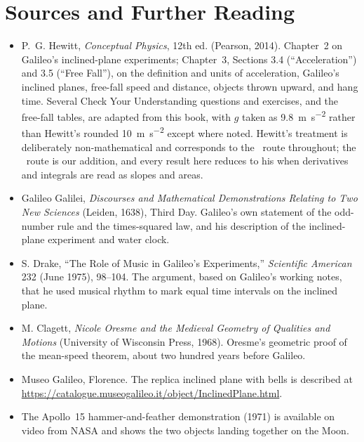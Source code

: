 \documentclass[11pt,twoside,openany]{book}
\newcommand{\viewtag}[3]{\fcolorbox{#2}{#3}{\footnotesize\textbf{\textcolor{#2}{#1}}}}
\newcommand{\elemtag}{\viewtag{Elementary}{elemcol}{elempale}}
\newcommand{\calctag}{\viewtag{Calculus}{calccol}{calcpale}}
\begin{document}
\section*{Sources and Further Reading}
\begin{itemize}[itemsep=3pt]
  \item P.~G. Hewitt, \emph{Conceptual Physics}, 12th ed. (Pearson, 2014). Chapter~2 on Galileo's inclined-plane experiments; Chapter~3, Sections 3.4 (``Acceleration'') and 3.5 (``Free Fall''), on the definition and units of acceleration, Galileo's inclined planes, free-fall speed and distance, objects thrown upward, and hang time. Several Check Your Understanding questions and exercises, and the free-fall tables, are adapted from this book, with $g$ taken as \SI{9.8}{\metre\per\second\squared} rather than Hewitt's rounded \SI{10}{\metre\per\second\squared} except where noted. Hewitt's treatment is deliberately non-mathematical and corresponds to the \elemtag\ route throughout; the \calctag\ route is our addition, and every result here reduces to his when derivatives and integrals are read as slopes and areas.
  \item Galileo Galilei, \emph{Discourses and Mathematical Demonstrations Relating to Two New Sciences} (Leiden, 1638), Third Day. Galileo's own statement of the odd-number rule and the times-squared law, and his description of the inclined-plane experiment and water clock.
  \item S. Drake, ``The Role of Music in Galileo's Experiments,'' \emph{Scientific American} 232 (June 1975), 98--104. The argument, based on Galileo's working notes, that he used musical rhythm to mark equal time intervals on the inclined plane.
  \item M. Clagett, \emph{Nicole Oresme and the Medieval Geometry of Qualities and Motions} (University of Wisconsin Press, 1968). Oresme's geometric proof of the mean-speed theorem, about two hundred years before Galileo.
  \item Museo Galileo, Florence. The replica inclined plane with bells is described at \url{https://catalogue.museogalileo.it/object/InclinedPlane.html}.
  \item The Apollo~15 hammer-and-feather demonstration (1971) is available on video from NASA and shows the two objects landing together on the Moon.
\end{itemize}
\end{document}
